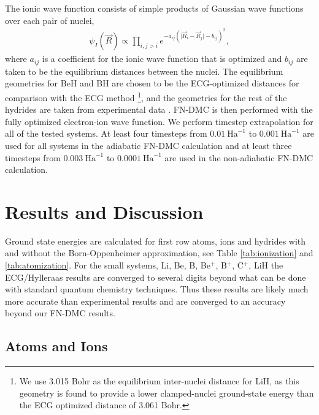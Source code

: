 \documentclass[pra,superscriptaddress,groupedaddress,twocolumn]{revtex4}
\begin{document}
The ionic wave function consists of simple products of Gaussian wave functions over each pair of nuclei,
\begin{align}
\psi_I(\vec{R})\propto \prod\limits_{i,j>i}e^{-a_{ij}(\vert \vec{R}_i-\vec{R}_j\vert-b_{ij})^2},
\label{wfs_ions}
\end{align}
where $a_{ij}$ is a coefficient for the ionic wave function that is optimized and $b_{ij}$ are taken to be the equilibrium distances between the nuclei. The equilibrium geometries for BeH and BH are chosen to be the ECG-optimized distances for comparison with the ECG method \footnote{We use 3.015 Bohr as the equilibrium inter-nuclei distance for LiH, as this geometry is found to provide a lower clamped-nuclei ground-state energy than the ECG optimized distance of 3.061 Bohr.}, and the geometries for the rest of the hydrides are taken from experimental data \cite{CCCBDB}. FN-DMC is then performed with the fully optimized electron-ion wave function. We perform timestep extrapolation for all of the tested systems. At least four timesteps from $0.01~\text{Ha}^{-1}$ to $0.001~\text{Ha}^{-1}$ are used for all systems in the adiabatic FN-DMC calculation and at least three timesteps from $0.003~\text{Ha}^{-1}$ to $0.0001~\text{Ha}^{-1}$ are used in the non-adiabatic FN-DMC calculation.

\section{Results and Discussion}


Ground state energies are calculated for first row atoms, ions and hydrides with and without the Born-Oppenheimer approximation, see Table \ref{tab:ionization} and \ref{tab:atomization}. For the small systems, Li, Be, B, Be$^+$, B$^+$, C$^+$, LiH the ECG/Hylleraas results are converged to several digits beyond what can be done with standard quantum chemistry techniques. Thus these results are likely much more accurate than experimental results and are converged to an accuracy beyond our FN-DMC results.

\subsection{Atoms and Ions}
\end{document}
